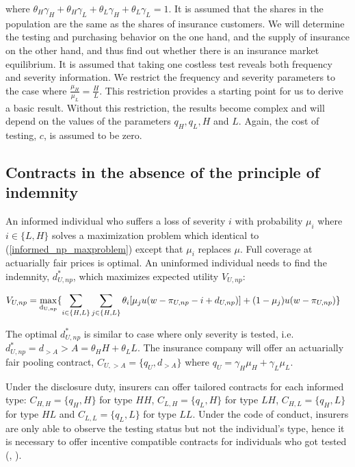 \documentclass[nonatbib,preprint,12pt]{elsarticle}
\theoremstyle{plain}
\theoremstyle{definition}
\theoremstyle{plain}
\theoremstyle{TheoremNum}
\theoremstyle{CorollaryNum}
\theoremstyle{PropositionNum}
\theoremstyle{TheoremNum}
\begin{document}
where $\theta_H \gamma_H + \theta_H \gamma_L + \theta_L \gamma_H + \theta_L \gamma_L = 1$. It is assumed that the shares in the population are the same as the shares of insurance customers. We will determine the testing and purchasing behavior on the one hand, and the supply of insurance on the other hand, and thus find out whether there is an insurance market equilibrium. It is assumed that taking one costless test reveals both frequency and severity information. We restrict the frequency and severity parameters to the case where $\frac{\mu_H}{\mu_L} = \frac{H}{L}$. This restriction provides a starting point for us to derive a basic result. Without this restriction, the results become complex and will depend on the values of the parameters $q_H, q_L, H$ and $L$. Again, the cost of testing, $c$, is assumed to be zero. 

\subsection{Contracts in the absence of the principle of indemnity}

\setcounter{theorem}{5}
\renewcommand{\thetheorem}{\arabic{theorem}}

An informed individual who suffers a loss of severity $i$ with probability $\mu_i$ where $i \in \{L,H\}$ solves a maximization problem which identical to (\ref{informed_np_maxproblem}) except that $\mu_i$ replaces $\mu$. Full coverage at actuarially fair prices is optimal. An uninformed individual needs to find the indemnity, $d_{U,np}^*$, which maximizes expected utility $V_{U,np}$:

\begin{align}
    V_{U,np} & = \underset{\rm d_{U,np}}{\rm max } \{\sum_{i \in \{H,L\}} \sum_{j \in \{H,L\}}\theta_i[\mu_j u(w-\pi_{U,np}-i+d_{U,np})] +(1-\mu_j)u(w-\pi_{U,np}) \}
\label{uninformed_np_maxproblem_freqsev}
\end{align}

The optimal $d_{U,np}^*$ is similar to case where only severity is tested, i.e. $d_{U,np}^* = d_{>A} > A = \theta_H H + \theta_L L$. The insurance company will offer an actuarially fair pooling contract, $C_{U,>A} = \{q_U, d_{>A}\}$ where $q_U = \gamma_H \mu_H + \gamma_L \mu_L$.

Under the disclosure duty, insurers can offer tailored contracts for each informed type: $C_{H,H} = \{q_H, H\}$ for type $HH$, $C_{L,H} = \{q_L, H\}$ for type $LH$, $C_{H,L} = \{q_H, L\}$ for type $HL$ and $C_{L,L} = \{q_L, L\}$ for type $LL$. Under the code of conduct, insurers are only able to observe the testing status but not the individual's type, hence it is necessary to offer incentive compatible contracts for individuals who got tested (\citeauthor{rothschild1978equilibrium}, \citeyear{rothschild1978equilibrium}). 
\end{document}
